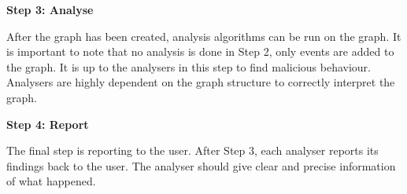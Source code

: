 \textbf{Step 3: Analyse}

After the graph has been created, analysis algorithms can be run on the graph. It is important to note that no analysis is done in Step 2, only events are added to the graph. It is up to the analysers in this step to find malicious behaviour. Analysers are highly dependent on the graph structure to correctly interpret the graph.

\textbf{Step 4: Report}

The final step is reporting to the user. After Step 3, each analyser reports its findings back to the user. The analyser should give clear and precise information of what happened.
